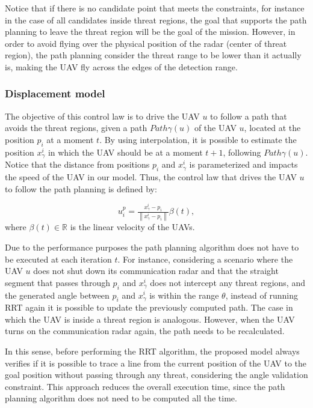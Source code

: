 Notice that if there is no candidate point that meets the constraints, for instance in the case of all candidates inside threat regions, the goal that supports the path planning to leave the threat region will be the goal of the mission. However, in order to avoid flying over the physical position of the radar (center of threat region), the path planning consider the threat range to be lower than it actually is, making the UAV fly across the edges of the detection range. 

\subsubsection{Displacement model}

The objective of this control law is to drive the UAV $u$ to follow a path that avoids the threat regions, given a path $Path\gamma(u)$ of the UAV $u$, located at the position $p_i$ at a moment $t$. By using interpolation, it is possible to estimate the position $x_\gamma^i$ in which the UAV should be at a moment $t+1$, following $Path\gamma(u)$. Notice that the distance from positions $p_i$ and $x_\gamma^i$ is  parameterized and impacts the speed of the UAV in our model. Thus, the control law that drives the UAV $u$ to follow the path planning is defined by:

\begin{equation}
u_i^p = \tfrac{x_\gamma^i - p_i}{\left\| x_\gamma^i - p_i \right\|}\beta\left(t\right),
\label{eq:controllawPathPlanning}
\end{equation}
where $\beta\left(t\right)\in\mathbb{R}$ is the linear velocity of the UAVs.

Due to the performance purposes the path planning algorithm does not have to be executed at each iteration $t$. For instance, considering a scenario where the UAV $u$ does not shut down its communication radar and that the straight segment that passes through $p_i$ and $x_\gamma^i$ does not intercept any threat regions, and the generated angle between $p_i$ and $x_\gamma^i$ is within the range $\theta$, instead of running RRT again it is possible to update the previously computed path. The case in which the UAV is inside a threat region is analogous. However, when the UAV turns on the communication radar again, the path needs to be recalculated.

In this sense, before performing the RRT algorithm, the proposed model always verifies if it is possible to trace a line from the current position of the UAV to the goal position without passing through any threat, considering the angle validation constraint. This approach reduces the overall execution time, since the path planning algorithm does not need to be computed all the time.